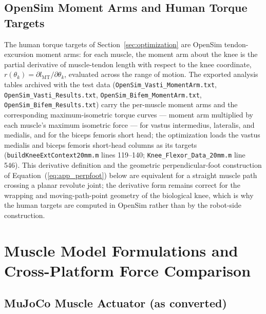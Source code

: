 \subsection{OpenSim Moment Arms and Human Torque Targets}
\label{sec:app_opensim_targets}

The human torque targets of Section~\ref{sec:optimization} are OpenSim
tendon-excursion moment arms: for each muscle, the moment arm about the
knee is the partial derivative of muscle-tendon length with respect to
the knee coordinate, $r(\theta_{k}) = \partial l_{\mathrm{MT}} /
\partial\theta_{k}$, evaluated across the range of motion. The exported
analysis tables archived with the test data
(\texttt{OpenSim\_Vasti\_MomentArm.txt}, \texttt{OpenSim\_Vasti\_Results.txt},
\texttt{OpenSim\_Bifem\_MomentArm.txt}, \texttt{OpenSim\_Bifem\_Results.txt})
carry the per-muscle moment arms and the corresponding
maximum-isometric torque curves --- moment arm multiplied by each
muscle's maximum isometric force --- for vastus intermedius,
lateralis, and medialis, and for the biceps femoris short head; the
optimization loads the vastus medialis and biceps femoris short-head
columns as its targets (\texttt{buildKneeExtContext20mm.m} lines
119--140; \texttt{Knee\_Flexor\_Data\_20mm.m} line 546). This
derivative definition and the geometric perpendicular-foot construction
of Equation~(\ref{eq:app_perpfoot}) below are equivalent for a straight
muscle path crossing a planar revolute joint; the derivative form
remains correct for the wrapping and moving-path-point geometry of the
biological knee, which is why the human targets are computed in OpenSim
rather than by the robot-side construction.

\section{Muscle Model Formulations and Cross-Platform Force Comparison}
\label{sec:muscle-models}

\subsection{MuJoCo Muscle Actuator (as converted)}

